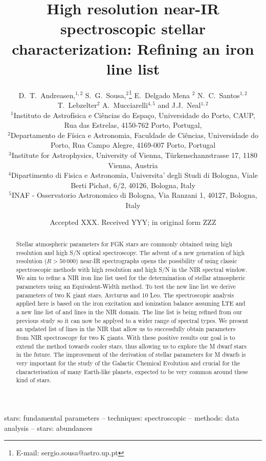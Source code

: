 \documentclass[a4paper,fleqn,usenatbib]{mnras}
\title[High resolution near-IR spectroscopic stellar characterization]{High resolution 
near-IR spectroscopic stellar characterization: Refining an iron line list}
\author[D.~T.~Andreasen et al.]{
D.~T.~Andreasen,$^{1,2}$
S.~G.~Sousa,$^{2}$\thanks{E-mail: sergio.sousa@astro.up.pt}
E.~Delgado Mena $^{2}$
N.~C.~Santos$^{1,2}$
\newauthor
T.~Lebzelter$^{2}$
A.~Mucciarelli$^{4,5}$
and J.J.~Neal$^{1,2}$
\\
$^{1}$Instituto de Astrof\'isica e Ci\^encias do Espa\c{c}o, Universidade do Porto, CAUP, Rua das Estrelas, 4150-762 Porto, Portugal,\\
$^{2}$Departamento de F\'isica e Astronomia, Faculdade de Ci\^encias, Universidade do Porto, Rua Campo Alegre, 4169-007 Porto, Portugal\\
$^{3}$Institute for Astrophysics, University of Vienna, T\"urkenschanzstrasse 17, 1180 Vienna, Austria\\
$^{4}$Dipartimento di Fisica e Astronomia, Universita' degli Studi di Bologna, Viale Berti Pichat, 6/2, 40126, Bologna, Italy\\
$^{5}$INAF - Osservatorio Astronomico di Bologna, Via Ranzani 1, 40127, Bologna, Italy
}
\date{Accepted XXX. Received YYY; in original form ZZZ}
\begin{document}
\label{firstpage}
\pagerange{\pageref{firstpage}--\pageref{lastpage}}
\maketitle

\begin{abstract}

Stellar atmospheric parameters for FGK stars are commonly obtained using high resolution and 
high S/N optical spectroscopy. The advent of a new generation of high resolution ($R>50\,000$) 
near-IR spectrographs opens the possibility of using classic spectroscopic methods with 
high resolution and high S/N in the NIR spectral window.
We aim to refine a NIR iron line list used for the determination of stellar atmospheric parameters
using an Equivalent-Width method. To test the new line list we derive parameters of two K giant stars,
Arcturus and 10 Leo.
The spectroscopic analysis applied here is based on the iron excitation and ionization balance assuming LTE 
and a new line list of  and  lines in the NIR domain. The line list is being refined
from our previous study so it can now be applyed to a wider range of spectral types.
We present an updated list of lines in the NIR that allow us to successfully obtain parameters from NIR spectroscopy 
for two K giants.
With these positive results our goal is to extend the method towards cooler stars, thus
allowing us to explore the M dwarf stars in the future. The improvement of the derivation of
stellar parameters for M dwarfs is very important for the study of the Galactic Chemical Evolution
and crucial for the characterisation of many Earth-like planets, expected to be very common around
these kind of stars.


\end{abstract}

\begin{keywords}
stars: fundamental parameters -- techniques: spectroscopic -- methods: data analysis -- stars: abundances
\end{keywords}

\end{document}
